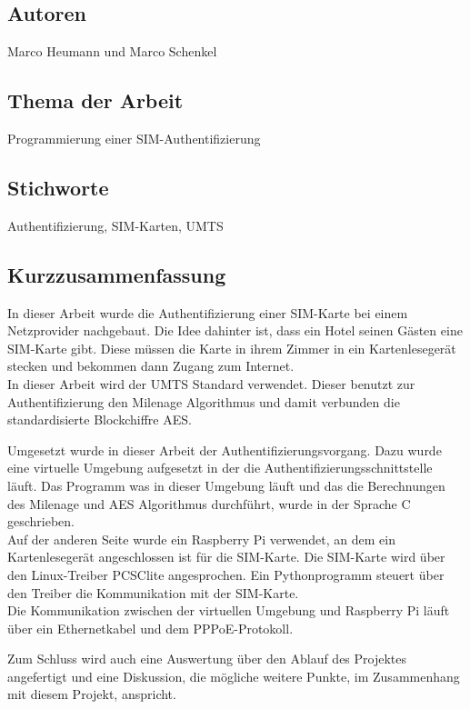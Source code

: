 \subsection*{Autoren}
Marco Heumann und Marco Schenkel

\subsection*{Thema der Arbeit}
Programmierung einer SIM-Authentifizierung

\subsection*{Stichworte}
Authentifizierung, SIM-Karten, UMTS

\subsection*{Kurzzusammenfassung}

In dieser Arbeit wurde die Authentifizierung einer SIM-Karte
bei einem Netzprovider nachgebaut. Die Idee dahinter ist, dass
ein Hotel seinen Gästen eine SIM-Karte gibt. Diese müssen die
Karte in ihrem Zimmer in ein Kartenlesegerät stecken und bekommen
dann Zugang zum Internet. \\
In dieser Arbeit wird der UMTS Standard verwendet. Dieser benutzt
zur Authentifizierung den Milenage Algorithmus und damit verbunden
die standardisierte Blockchiffre AES.

Umgesetzt wurde in dieser Arbeit der Authentifizierungsvorgang. Dazu
wurde eine virtuelle Umgebung aufgesetzt in der die Authentifizierungsschnittstelle
läuft. Das Programm was in dieser Umgebung läuft und das die Berechnungen
des Milenage und AES Algorithmus durchführt, wurde in der Sprache C
geschrieben. \\
Auf der anderen Seite wurde ein Raspberry Pi verwendet, an dem ein Kartenlesegerät
angeschlossen ist für die SIM-Karte. Die SIM-Karte wird über den Linux-Treiber
PCSClite angesprochen. Ein Pythonprogramm steuert über den Treiber die Kommunikation
mit der SIM-Karte. \\
Die Kommunikation zwischen der virtuellen Umgebung und Raspberry Pi läuft über
ein Ethernetkabel und dem PPPoE-Protokoll.

Zum Schluss wird auch eine Auswertung über den Ablauf des Projektes angefertigt und
eine Diskussion, die mögliche weitere Punkte, im Zusammenhang mit diesem Projekt,
anspricht.
